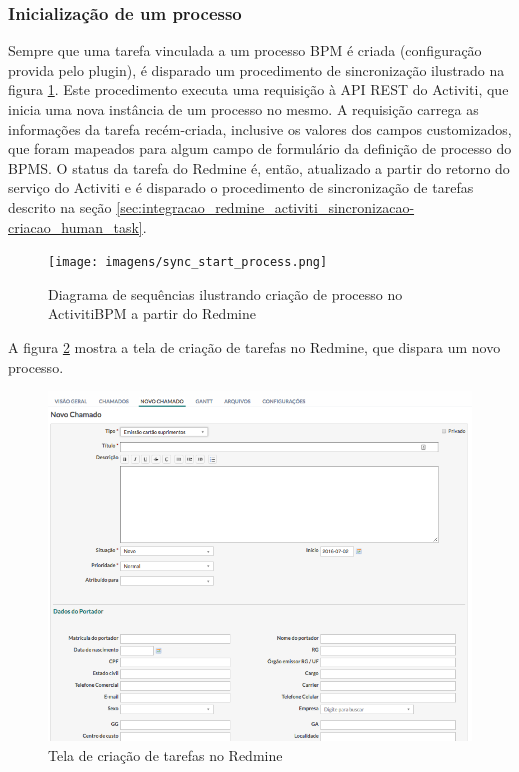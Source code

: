 \subsubsection{Inicialização de um processo}\label{sec:integracao_redmine_activiti_sincronizacao-inicializacao_processo}
Sempre que uma tarefa vinculada a um processo BPM é criada (configuração provida pelo plugin), é disparado um procedimento de sincronização ilustrado na figura \ref{fig:start_process_diagram}. Este procedimento executa uma requisição à API REST do Activiti, que inicia uma nova instância de um processo no mesmo. A requisição carrega as informações da tarefa recém-criada, inclusive os valores dos campos customizados, que foram mapeados para algum campo de formulário da definição de processo do BPMS. O status da tarefa do Redmine é, então, atualizado a partir do retorno do serviço do Activiti e é disparado o procedimento de sincronização de tarefas descrito na seção \ref{sec:integracao_redmine_activiti_sincronizacao-criacao_human_task}.

\begin{figure}[H]
\centering
\texttt{[image: imagens/sync\_start\_process.png]}
\caption{Diagrama de sequências ilustrando criação de processo no ActivitiBPM a partir do Redmine}
\label{fig:start_process_diagram}
\end{figure}


A figura \ref{fig:new_issue} mostra a tela de criação de tarefas no Redmine, que dispara um novo processo.

\begin{figure}[H]
\centering
\includegraphics[width=1\textwidth]{imagens/redmine_new_issue.png}
\caption{Tela de criação de tarefas no Redmine}
\label{fig:new_issue}
\end{figure}

